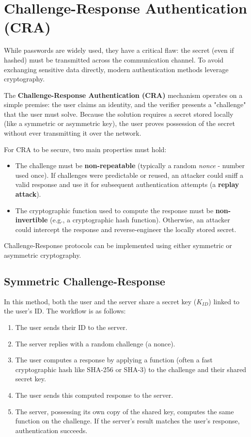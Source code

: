 \section{Challenge-Response Authentication (CRA)}
While passwords are widely used, they have a critical flaw: the secret (even if hashed) must be transmitted across the communication channel. To avoid exchanging sensitive data directly, modern authentication methods leverage cryptography.

The \textbf{Challenge-Response Authentication (CRA)} mechanism operates on a simple premise: the user claims an identity, and the verifier presents a "challenge" that the user must solve. Because the solution requires a secret stored locally (like a symmetric or asymmetric key), the user proves possession of the secret without ever transmitting it over the network.

For CRA to be secure, two main properties must hold:
\begin{itemize}
    \item The challenge must be \textbf{non-repeatable} (typically a random \textit{nonce} - number used once). If challenges were predictable or reused, an attacker could sniff a valid response and use it for subsequent authentication attempts (a \textbf{replay attack}).
    \item The cryptographic function used to compute the response must be \textbf{non-invertible} (e.g., a cryptographic hash function). Otherwise, an attacker could intercept the response and reverse-engineer the locally stored secret.
\end{itemize}

Challenge-Response protocols can be implemented using either symmetric or asymmetric cryptography.

\subsection{Symmetric Challenge-Response}
In this method, both the user and the server share a secret key ($K_{ID}$) linked to the user's ID. The workflow is as follows:
\begin{enumerate}
    \item The user sends their ID to the server.
    \item The server replies with a random challenge (a nonce).
    \item The user computes a response by applying a function (often a fast cryptographic hash like SHA-256 or SHA-3) to the challenge and their shared secret key.
    \item The user sends this computed response to the server.
    \item The server, possessing its own copy of the shared key, computes the same function on the challenge. If the server's result matches the user's response, authentication succeeds.
\end{enumerate}

